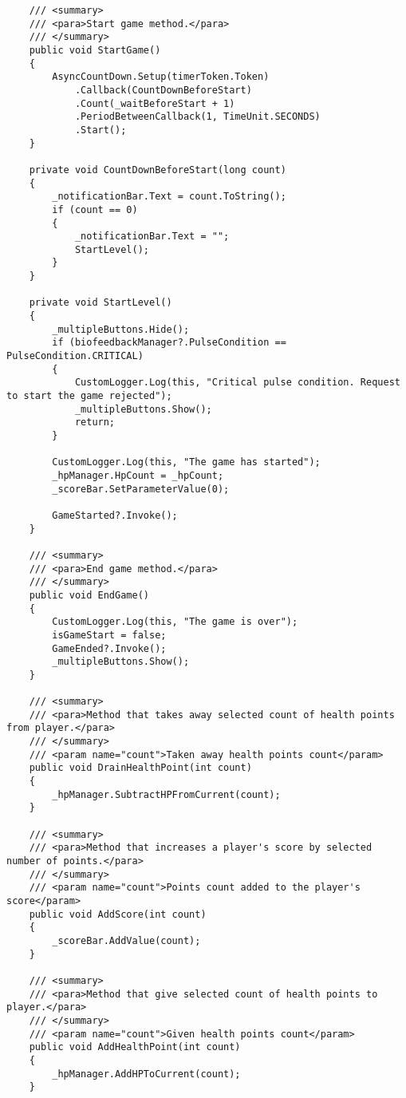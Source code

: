 \begin{verbatim}
    /// <summary>
    /// <para>Start game method.</para>
    /// </summary>
    public void StartGame()
    {
        AsyncCountDown.Setup(timerToken.Token)
            .Callback(CountDownBeforeStart)
            .Count(_waitBeforeStart + 1)
            .PeriodBetweenCallback(1, TimeUnit.SECONDS)
            .Start();
    }

    private void CountDownBeforeStart(long count)
    {
        _notificationBar.Text = count.ToString();
        if (count == 0)
        {
            _notificationBar.Text = "";
            StartLevel();
        }
    }

    private void StartLevel()
    {
        _multipleButtons.Hide();
        if (biofeedbackManager?.PulseCondition == PulseCondition.CRITICAL)
        {
            CustomLogger.Log(this, "Critical pulse condition. Request to start the game rejected");
            _multipleButtons.Show();
            return;
        }
        
        CustomLogger.Log(this, "The game has started");
        _hpManager.HpCount = _hpCount;
        _scoreBar.SetParameterValue(0);
        
        GameStarted?.Invoke();
    }

    /// <summary>
    /// <para>End game method.</para>
    /// </summary>
    public void EndGame()
    {
        CustomLogger.Log(this, "The game is over");
        isGameStart = false;
        GameEnded?.Invoke();
        _multipleButtons.Show();
    }

    /// <summary>
    /// <para>Method that takes away selected count of health points from player.</para>
    /// </summary>
    /// <param name="count">Taken away health points count</param>
    public void DrainHealthPoint(int count)
    {
        _hpManager.SubtractHPFromCurrent(count);
    }

    /// <summary>
    /// <para>Method that increases a player's score by selected number of points.</para>
    /// </summary>
    /// <param name="count">Points count added to the player's score</param>
    public void AddScore(int count)
    {
        _scoreBar.AddValue(count);
    }

    /// <summary>
    /// <para>Method that give selected count of health points to player.</para>
    /// </summary>
    /// <param name="count">Given health points count</param>
    public void AddHealthPoint(int count)
    {
        _hpManager.AddHPToCurrent(count);
    }


\end{verbatim}
